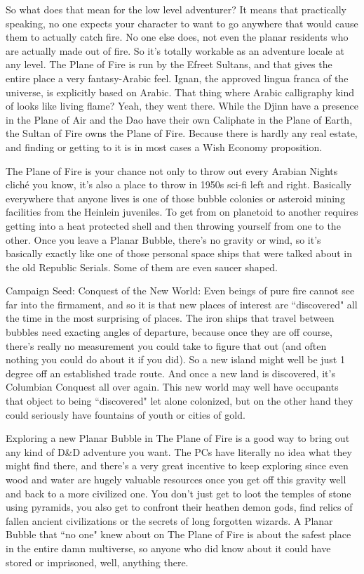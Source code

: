 So what does that mean for the low level adventurer? It means that practically speaking, no one expects your character to want to go anywhere that would cause them to actually catch fire. No one else does, not even the planar residents who are actually made out of fire. So it's totally workable as an adventure locale at any level. The Plane of Fire is run by the Efreet Sultans, and that gives the entire place a very fantasy-Arabic feel. Ignan, the approved lingua franca of the universe, is explicitly based on Arabic. That thing where Arabic calligraphy kind of looks like living flame? Yeah, they went there. While the Djinn have a presence in the Plane of Air and the Dao have their own Caliphate in the Plane of Earth, the Sultan of Fire owns the Plane of Fire. Because there is hardly any real estate, and finding or getting to it is in most cases a Wish Economy proposition.

The Plane of Fire is your chance not only to throw out every Arabian Nights cliché you know, it's also a place to throw in 1950s sci-fi left and right. Basically everywhere that anyone lives is one of those bubble colonies or asteroid mining facilities from the Heinlein juveniles. To get from on planetoid to another requires getting into a heat protected shell and then throwing yourself from one to the other. Once you leave a Planar Bubble, there's no gravity or wind, so it's basically exactly like one of those personal space ships that were talked about in the old Republic Serials. Some of them are even saucer shaped.

Campaign Seed: Conquest of the New World: Even beings of pure fire cannot see far into the firmament, and so it is that new places of interest are ``discovered" all the time in the most surprising of places. The iron ships that travel between bubbles need exacting angles of departure, because once they are off course, there's really no measurement you could take to figure that out (and often nothing you could do about it if you did). So a new island might well be just 1 degree off an established trade route. And once a new land is discovered, it's Columbian Conquest all over again. This new world may well have occupants that object to being ``discovered" let alone colonized, but on the other hand they could seriously have fountains of youth or cities of gold.

Exploring a new Planar Bubble in The Plane of Fire is a good way to bring out any kind of D\&D adventure you want. The PCs have literally no idea what they might find there, and there's a very great incentive to keep exploring since even wood and water are hugely valuable resources once you get off this gravity well and back to a more civilized one. You don't just get to loot the temples of stone using pyramids, you also get to confront their heathen demon gods, find relics of fallen ancient civilizations or the secrets of long forgotten wizards. A Planar Bubble that ``no one" knew about on The Plane of Fire is about the safest place in the entire damn multiverse, so anyone who did know about it could have stored or imprisoned, well, anything there.

